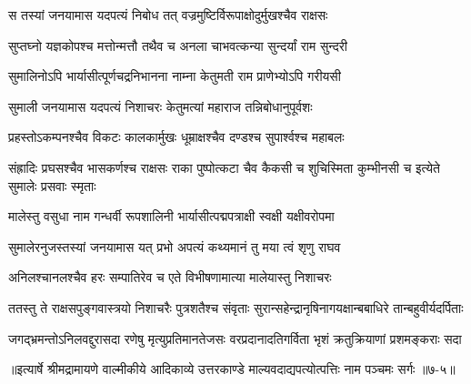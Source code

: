 \twolineshloka
{स तस्यां जनयामास यदपत्यं निबोध तत्}
{वज्रमुष्टिर्विरूपाक्षोदुर्मुखश्चैव राक्षसः} %

\twolineshloka
{सुप्तघ्नो यज्ञकोपश्च मत्तोन्मत्तौ तथैव च}
{अनला चाभवत्कन्या सुन्दर्यां राम सुन्दरी} %

\twolineshloka
{सुमालिनोऽपि भार्यासीत्पूर्णचद्रनिभानना}
{नाम्ना केतुमती राम प्राणेभ्योऽपि गरीयसी} %

\twolineshloka
{सुमाली जनयामास यदपत्यं निशाचरः}
{केतुमत्यां महाराज तन्निबोधानुपूर्वशः} %

\twolineshloka
{प्रहस्तोऽकम्पनश्चैव विकटः कालकार्मुखः}
{धूम्राक्षश्चैव दण्डश्च सुपार्श्वश्च महाबलः} %

\twolineshloka
{संह्रादिः प्रघसश्चैव भासकर्णश्च राक्षसः}
{राका पुष्पोत्कटा चैव कैकसी च शुचिस्मिता कुम्भीनसी च इत्येते सुमालेः प्रसवाः स्मृताः} %

\twolineshloka
{मालेस्तु वसुधा नाम गन्धर्वी रूपशालिनी}
{भार्यासीत्पद्मपत्राक्षी स्वक्षी यक्षीवरोपमा} %

\twolineshloka
{सुमालेरनुजस्तस्यां जनयामास यत् प्रभो}
{अपत्यं कथ्यमानं तु मया त्वं शृणु राघव} %

\twolineshloka
{अनिलश्चानलश्चैव हरः सम्पातिरेव च}
{एते विभीषणामात्या मालेयास्तु निशाचरः} %

\twolineshloka
{ततस्तु ते राक्षसपुङ्गवास्त्रयो निशाचरैः पुत्रशतैश्च संवृताः}
{सुरान्सहेन्द्रानृषिनागयक्षान्बबाधिरे तान्बहुवीर्यदर्पिताः} %

\twolineshloka
{जगद्भ्रमन्तोऽनिलवद्दुरासदा रणेषु मृत्युप्रतिमानतेजसः}
{वरप्रदानादतिगर्विता भृशं क्रतुक्रियाणां प्रशमङ्कराः सदा} %


॥इत्यार्षे श्रीमद्रामायणे वाल्मीकीये आदिकाव्ये उत्तरकाण्डे माल्यवदाद्यपत्योत्पत्तिः नाम पञ्चमः सर्गः ॥७-५॥
